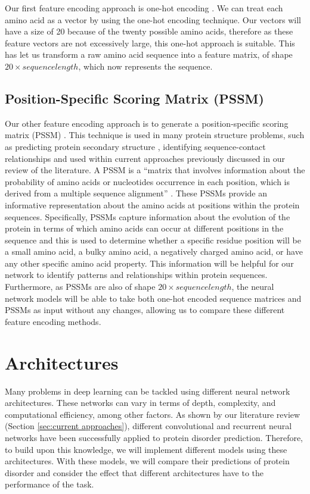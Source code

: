 \documentclass{l4proj}
\begin{document}
Our first feature encoding approach is one-hot encoding \citep{One-hot:wiki} \citep{Fawcett:21}. We can treat each amino acid as a vector by using the one-hot encoding technique. Our vectors will have a size of 20 because of the twenty possible amino acids, therefore as these feature vectors are not excessively large, this one-hot approach is suitable. This has let us transform a raw amino acid sequence into a feature matrix, of shape $20 \times sequence length$, which now represents the sequence.

\subsection{Position-Specific Scoring Matrix (PSSM)}

Our other feature encoding approach is to generate a position-specific scoring matrix (PSSM) \citep{PSSM:wiki}. This technique is used in many protein structure problems, such as predicting protein secondary structure \citep{McGuffin:00}, identifying sequence-contact relationships \citep{Wang:17} and used within current approaches previously discussed in our review of the literature. A PSSM is a “matrix that involves information about the probability of amino acids or nucleotides occurrence in each position, which is derived from a multiple sequence alignment” \citep{Mohammadi:22}. These PSSMs provide an informative representation about the amino acids at positions within the protein sequences. Specifically, PSSMs capture information about the evolution of the protein in terms of which amino acids can occur at different positions in the sequence and this is used to determine whether a specific residue position will be a small amino acid, a bulky amino acid, a negatively charged amino acid, or have any other specific amino acid property. This information will be helpful for our network to identify patterns and relationships within protein sequences. Furthermore, as PSSMs are also of shape $20 \times sequence length$, the neural network models will be able to take both one-hot encoded sequence matrices and PSSMs as input without any changes, allowing us to compare these different feature encoding methods.

\section{Architectures}

Many problems in deep learning can be tackled using different neural network architectures. These networks can vary in terms of depth, complexity, and computational efficiency, among other factors. As shown by our literature review (Section \ref{sec:current approaches}), different convolutional and recurrent neural networks have been successfully applied to protein disorder prediction. Therefore, to build upon this knowledge, we will implement different models using these architectures. With these models, we will compare their predictions of protein disorder and consider the effect that different architectures have to the performance of the task.
\end{document}
